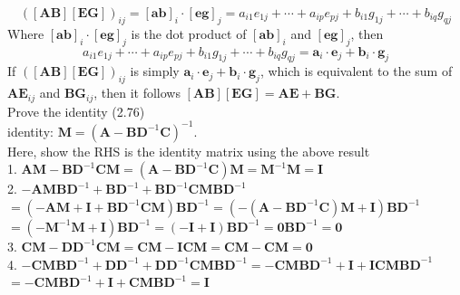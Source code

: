 \documentclass{article}
\begin{document}
$$([\mathbf{A B}][\mathbf{E G}])_{i j}=[\mathbf{a b}]_{i} \cdot[\mathbf{e g}]_{j}=a_{i 1} e_{1 j}+\cdots+a_{i p} e_{p j}+b_{i 1} g_{1 j}+\cdots+b_{i q} g_{q j}$$
Where $[\mathbf{a b}]_{i} \cdot[\mathbf{e g}]_{j}$ is the dot product of $[\mathbf{a b}]_{i}$ and $[\mathbf{e g}]_{j}$, then
$$
a_{i 1} e_{1 j}+\cdots+a_{i p} e_{p j}+b_{i 1} g_{1 j}+\cdots+b_{i q} g_{q j}=\mathbf{a}_{i} \cdot \mathbf{e}_{j}+\mathbf{b}_{i} \cdot \mathbf{g}_{j}
$$
If $([\mathbf{A B}][\mathbf{E G}])_{i j}$ is simply $\mathbf{a}_{i} \cdot \mathbf{e}_{j}+\mathbf{b}_{i} \cdot \mathbf{g}_{j}$, which is equivalent to the sum of $\mathbf{A E}_{i j}$ and $\mathbf{B G}_{i j}$, then it follows $[\mathbf{A B}][\mathbf{E G}]=\mathbf{A E}+\mathbf{B G}$.
\\Prove the identity (2.76)
\\identity: $\mathbf{M}=\left(\mathbf{A}-\mathbf{B} \mathbf{D}^{-1} \mathbf{C}\right)^{-1}$.
\\Here, show the RHS is the identity matrix using the above result
\\1. $\mathbf{A M}-\mathbf{B D}^{-1} \mathbf{C M}=\left(\mathbf{A}-\mathbf{B D}^{-1} \mathbf{C}\right) \mathbf{M}=\mathbf{M}^{-1} \mathbf{M}=\mathbf{I}$
\\2. $-\mathbf{A M B D}^{-1}+\mathbf{B D}^{-1}+\mathbf{B D}^{-1} \mathbf{C M B D}^{-1}$\\$=\left(-\mathbf{A M}+\mathbf{I}+\mathbf{B D}^{-1} \mathbf{C M}\right) \mathbf{B D}^{-1}=\left(-\left(\mathbf{A}-\mathbf{B D}^{-1} \mathbf{C}\right) \mathbf{M}+\mathbf{I}\right) \mathbf{B D}^{-1}$\\
$=\left(-\mathbf{M}^{-1} \mathbf{M}+\mathbf{I}\right) \mathbf{B D}^{-1}=(-\mathbf{I}+\mathbf{I}) \mathbf{B D}^{-1}=\mathbf{0} \mathbf{B D}^{-1}=\mathbf{0}$
\\3. $\mathbf{C M}-\mathbf{D D}^{-1} \mathbf{C M}=\mathbf{C M}-\mathbf{I C M}=\mathbf{C M}-\mathbf{C M}=\mathbf{0}$
\\4. $-\mathbf{C M B D}^{-1}+\mathbf{D D}^{-1}+\mathbf{D D}^{-1} \mathbf{C M B D}^{-1}=-\mathbf{C M B D}^{-1}+\mathbf{I}+\mathbf{I C M B D}^{-1}$ $=-\mathbf{C M B D}^{-1}+\mathbf{I}+\mathbf{C M B D}^{-1}=\mathbf{I}$
\end{document}
